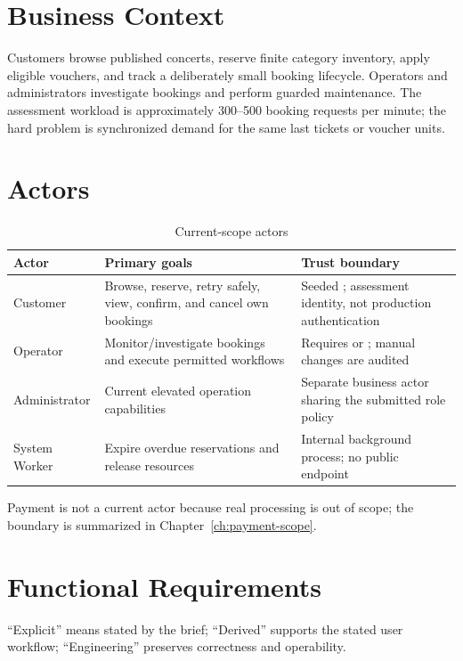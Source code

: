 \section{Business Context}
Customers browse published concerts, reserve finite category inventory, apply
eligible vouchers, and track a deliberately small booking lifecycle. Operators
and administrators investigate bookings and perform guarded maintenance. The
assessment workload is approximately 300--500 booking requests per minute; the
hard problem is synchronized demand for the same last tickets or voucher units.

\section{Actors}
\begin{table}[H]
\centering
\small
\caption{Current-scope actors}
\begin{tabularx}{\textwidth}{p{}p{}Y}
\toprule
\textbf{Actor} & \textbf{Primary goals} & \textbf{Trust boundary} \\
\midrule
Customer & Browse, reserve, retry safely, view, confirm, and cancel own bookings & Seeded ; assessment identity, not production authentication \\
Operator & Monitor/investigate bookings and execute permitted workflows & Requires  or ; manual changes are audited \\
Administrator & Current elevated operation capabilities & Separate business actor sharing the submitted role policy \\
System Worker & Expire overdue reservations and release resources & Internal background process; no public endpoint \\
\bottomrule
\end{tabularx}
\end{table}

Payment is not a current actor because real processing is out of scope; the
boundary is summarized in Chapter~\ref{ch:payment-scope}.

\section{Functional Requirements}
``Explicit'' means stated by the brief; ``Derived'' supports the stated user
workflow; ``Engineering'' preserves correctness and operability.

